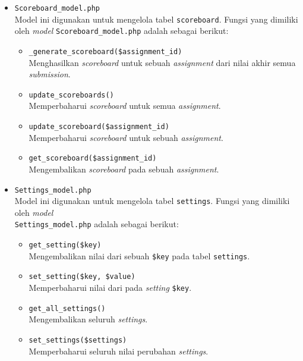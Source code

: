 \documentclass[a4paper,twoside]{article}
\begin{document}
\begin{enumerate}
\begin{itemize}
\begin{itemize}
			            \item \verb|Scoreboard_model.php| \\
			                  Model ini digunakan untuk mengelola tabel \verb|scoreboard|. Fungsi yang dimiliki oleh \textit{model} \verb|Scoreboard_model.php| adalah sebagai berikut:

			                  \begin{itemize}
				                  \item \verb|_generate_scoreboard($assignment_id)| \\
				                        Menghasilkan \textit{scoreboard} untuk sebuah \textit{assignment} dari nilai akhir semua \textit{submission}.
				                  \item \verb|update_scoreboards()| \\
				                        Memperbaharui \textit{scoreboard} untuk semua \textit{assignment}.
				                  \item \verb|update_scoreboard($assignment_id)| \\
				                        Memperbaharui \textit{scoreboard} untuk sebuah \textit{assignment}.
				                  \item \verb|get_scoreboard($assignment_id)| \\
				                        Mengembalikan \textit{scoreboard} pada sebuah \textit{assignment}.
			                  \end{itemize}

			            \item \verb|Settings_model.php| \\
			                  Model ini digunakan untuk mengelola tabel \verb|settings|. Fungsi yang dimiliki oleh \textit{model} \\\verb|Settings_model.php| adalah sebagai berikut:

			                  \begin{itemize}
				                  \item \verb|get_setting($key)| \\
				                        Mengembalikan nilai dari sebuah \verb|$key| pada tabel \verb|settings|.
				                  \item \verb|set_setting($key, $value)| \\
				                        Memperbaharui nilai dari pada \textit{setting} \verb|$key|.
				                  \item \verb|get_all_settings()| \\
				                        Mengembalikan seluruh \textit{settings}.
				                  \item \verb|set_settings($settings)| \\
				                        Memperbaharui seluruh nilai perubahan \textit{settings}.
			                  \end{itemize}


\end{itemize}
\end{itemize}
\end{enumerate}
\end{document}
